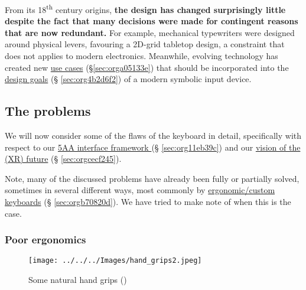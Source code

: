 \documentclass[logo,bsc,singlespacing,parskip]{infthesis}
\begin{document}
From its 18\textsuperscript{th} century origins, \textbf{the design has changed surprisingly little despite the fact that many decisions were made for contingent reasons that are now redundant.}
For example, mechanical typewriters were designed around physical levers, favouring a 2D-grid tabletop design, a constraint that does not applies to modern electronics.
Meanwhile, evolving technology has created new \hyperref[sec:orga05133e]{use cases} (\S \ref{sec:orga05133e}) that should be incorporated into the \hyperref[sec:org4b2d6f2]{design goals} (§ \ref{sec:org4b2d6f2}) of a modern symbolic input device.
\subsection{The problems}
\label{sec:org469b1c5}
We will now consider some of the flaws of the keyboard in detail, specifically with respect to our  \hyperref[sec:org11eb39c]{5AA interface framework } (§ \ref{sec:org11eb39c}) and our \hyperref[sec:orgcecf245]{vision of the (XR) future} (§ \ref{sec:orgcecf245}).

Note, many of the discussed problems have already been fully or partially solved, sometimes in several different ways, most commonly by \hyperref[sec:orgb70820d]{ergonomic/custom keyboards} (§ \ref{sec:orgb70820d}).
We have tried to make note of when this is the case.
\subsubsection{Poor ergonomics}
\label{sec:org56ad43b}
\begin{figure}[h]
\centering
\texttt{[image: ../../../Images/hand\_grips2.jpeg]}
\caption{\label{fig:hand_grips}Some natural hand grips (\autocite{victorBriefRantFuture})}
\end{figure}
\end{document}
